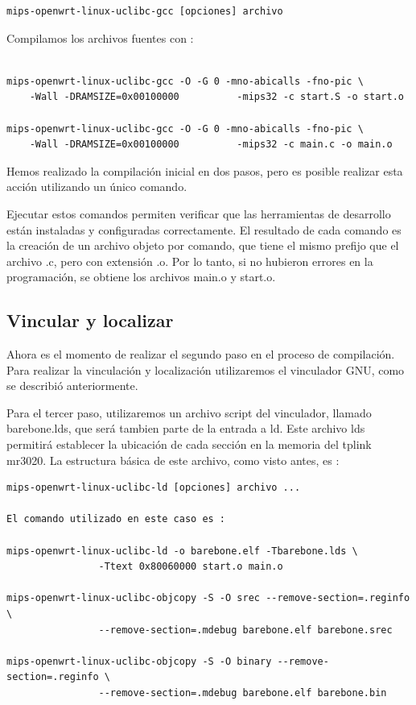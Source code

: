 \documentclass[output=paper, 
colorlinks,
citecolor=brown,
newtxmath
]{langscibook}
\begin{document}
\begin{verbatim}
mips-openwrt-linux-uclibc-gcc [opciones] archivo
\end{verbatim}

Compilamos los archivos fuentes con :

\begin{verbatim}

mips-openwrt-linux-uclibc-gcc -O -G 0 -mno-abicalls -fno-pic \
    -Wall -DRAMSIZE=0x00100000          -mips32 -c start.S -o start.o

mips-openwrt-linux-uclibc-gcc -O -G 0 -mno-abicalls -fno-pic \
    -Wall -DRAMSIZE=0x00100000          -mips32 -c main.c -o main.o

\end{verbatim}

Hemos realizado la compilación inicial en dos pasos, pero es posible realizar
esta acción utilizando un único comando.

Ejecutar estos comandos permiten verificar que las herramientas de desarrollo
están instaladas y configuradas correctamente. El resultado 
de cada comando es la creación de un archivo objeto por comando, que tiene
el mismo prefijo que el archivo .c, pero con extensión .o.
Por lo tanto, si no hubieron errores en la programación, se obtiene
los archivos main.o y start.o.

\subsection {Vincular y localizar}

Ahora es el momento de realizar el segundo paso en el proceso de compilación.
Para realizar la vinculación y localización utilizaremos el vinculador GNU,
como se describió anteriormente.

Para el tercer paso, utilizaremos un archivo script del vinculador, llamado
barebone.lds, que será tambien parte de la entrada a ld. Este archivo lds
permitirá establecer la ubicación de cada sección en la memoria del tplink
mr3020.  La estructura básica de este archivo, como visto antes, es :

\begin{verbatim}
mips-openwrt-linux-uclibc-ld [opciones] archivo ...

El comando utilizado en este caso es :

mips-openwrt-linux-uclibc-ld -o barebone.elf -Tbarebone.lds \
                -Ttext 0x80060000 start.o main.o

mips-openwrt-linux-uclibc-objcopy -S -O srec --remove-section=.reginfo \
                --remove-section=.mdebug barebone.elf barebone.srec

mips-openwrt-linux-uclibc-objcopy -S -O binary --remove-section=.reginfo \
                --remove-section=.mdebug barebone.elf barebone.bin
\end{verbatim}
\end{document}
